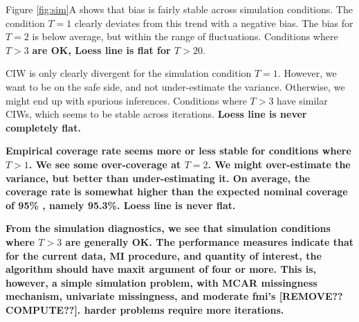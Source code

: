 \documentclass[article]{jss}
\begin{document}
Figure \ref{fig:sim}A shows that bias is fairly stable across simulation conditions. The condition $T=1$ clearly deviates from this trend with a negative bias. The bias for $T=2$ is below average, but within the range of fluctuations. Conditions where $T>3$ \textbf{are OK, Loess line is flat for $T>20$}.  

CIW is only clearly divergent for the simulation condition $T=1$. However, we want to be on the safe side, and not under-estimate the variance. Otherwise, we might end up with spurious inferences. Conditions where $T>3$ have similar CIWs, which seems to be stable across iterations. \textbf{Loess line is never completely flat.}%

\textbf{Empirical coverage rate seems more or less stable for conditions where $T>1$. We see some over-coverage at $T=2$. We might over-estimate the variance, but better than under-estimating it. On average, the coverage rate is somewhat higher than the expected nominal coverage of 95\% \cite{neym34}, namely 95.3\%. Loess line is never flat.}

\textbf{From the simulation diagnostics, we see that simulation conditions where $T>3$ are generally OK. The performance measures indicate that for the current data, MI procedure, and quantity of interest, the algorithm should have maxit argument of four or more. This is, however, a simple simulation problem, with MCAR missingness mechanism, univariate missingness, and moderate fmi's [REMOVE?? COMPUTE??]. harder problems require more iterations.} %
\end{document}
